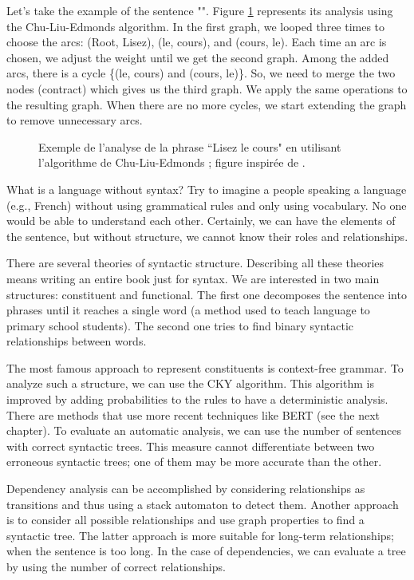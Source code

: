 \documentclass{KodeBook}
\begin{document}
Let's take the example of the sentence "".
Figure \ref{fig:cke-exp} represents its analysis using the Chu-Liu-Edmonds algorithm.
In the first graph, we looped three times to choose the arcs: (Root, Lisez), (le, cours), and (cours, le).
Each time an arc is chosen, we adjust the weight until we get the second graph.
Among the added arcs, there is a cycle \{(le, cours) and (cours, le)\}.
So, we need to merge the two nodes (contract) which gives us the third graph.
We apply the same operations to the resulting graph.
When there are no more cycles, we start extending the graph to remove unnecessary arcs.

\begin{figure}[ht]
	\centering
	\caption[Exemple de l'analyse Chu-Liu-Edmonds]{Exemple de l'analyse de la phrase ``Lisez le cours" en utilisant l'algorithme de Chu-Liu-Edmonds ; figure inspirée de \cite{2019-jurafsky-martin}.}
	\label{fig:cke-exp}
\end{figure}

What is a language without syntax?
Try to imagine a people speaking a language (e.g., French) without using grammatical rules and only using vocabulary. 
No one would be able to understand each other. 
Certainly, we can have the elements of the sentence, but without structure, we cannot know their roles and relationships.

There are several theories of syntactic structure. 
Describing all these theories means writing an entire book just for syntax. 
We are interested in two main structures: constituent and functional.
The first one decomposes the sentence into phrases until it reaches a single word (a method used to teach language to primary school students). 
The second one tries to find binary syntactic relationships between words.

The most famous approach to represent constituents is context-free grammar. 
To analyze such a structure, we can use the CKY algorithm. 
This algorithm is improved by adding probabilities to the rules to have a deterministic analysis. 
There are methods that use more recent techniques like BERT (see the next chapter). 
To evaluate an automatic analysis, we can use the number of sentences with correct syntactic trees. 
This measure cannot differentiate between two erroneous syntactic trees; one of them may be more accurate than the other.

Dependency analysis can be accomplished by considering relationships as transitions and thus using a stack automaton to detect them.
Another approach is to consider all possible relationships and use graph properties to find a syntactic tree. 
The latter approach is more suitable for long-term relationships; when the sentence is too long.
In the case of dependencies, we can evaluate a tree by using the number of correct relationships.
\end{document}

